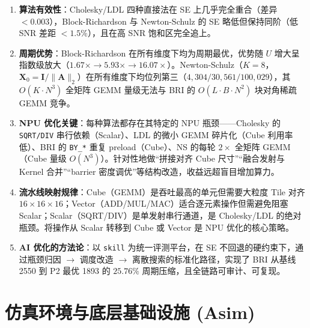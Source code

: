 \documentclass{CjC}
\begin{document}
    \begin{enumerate}
        \item \textbf{算法有效性}：Cholesky/LDL 四种直接法在 SE 上几乎完全重合（差异
            $<0.003$），Block-Richardson 与 Newton-Schulz 的 SE
            略低但保持同阶（低 SNR 差距 $<1.5\%$），且在高 SNR 饱和区完全追上。

        \item \textbf{周期优势}：Block-Richardson 在所有维度下均为周期最优，优势随
            $U$ 增大呈指数级放大（$1.67\times\rightarrow5.93\times\rightarrow16.0
            7\times$）。Newton-Schulz（$K=8$，$\bm{X}_{0}=\bm{I}/\|\bm{A}\|_{2}$）在所有维度下均位列第三（$4
            ,304/30,561/100,029$），其 $O(K\cdot N^{3})$ 全矩阵 GEMM 量级无法与 BRI
            的 $O(L\cdot B\cdot N^{2})$ 块对角稀疏 GEMM 竞争。

        \item \textbf{NPU 优化关键}：每种算法都存在其特定的 NPU 瓶颈——Cholesky 的
            \texttt{SQRT/DIV} 串行依赖（Scalar）、LDL 的微小 GEMM 碎片化（Cube
            利用率低）、BRI 的 \texttt{BY\_*} 重复 preload（Cube）、NS 的每轮 $2\times$
            全矩阵 GEMM（Cube 量级 $O(N^{3})$）。针对性地做“拼接对齐 Cube
            尺寸”“融合发射与 Kernel 合并”“barrier
            密度调优”等结构改造，收益远超盲目增加算力。

        \item \textbf{流水线映射规律}：Cube（GEMM）是吞吐最高的单元但需要大粒度 Tile
            对齐 $16\times16\times16$；Vector（ADD/MUL/MAC）适合逐元素操作但需避免阻塞
            Scalar；Scalar（SQRT/DIV）是单发射串行通道，是 Cholesky/LDL
            的绝对瓶颈。将操作从 Scalar 转移到 Cube 或 Vector 是 NPU
            优化的核心策略。

        \item \textbf{AI 优化的方法论}：以 \texttt{skill} 为统一评测平台，在 SE
            不回退的硬约束下，通过瓶颈归因 $\rightarrow$ 调度改造 $\rightarrow$
            离散搜索的标准化路径，实现了 BRI 从基线 2550 到 P2 最优 1893 的
            $25.76\%$ 周期压缩，且全链路可审计、可复现。
    \end{enumerate}


    \section{仿真环境与底层基础设施 (Asim)}
    \label{sec:asim-infra}
\end{document}
